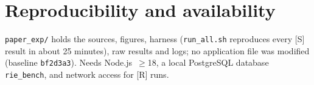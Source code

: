 \documentclass[conference]{IEEEtran}
\newcommand{\code}[1]{\texttt{\small #1}}
\begin{document}
\section*{Reproducibility and availability}
\code{paper\_exp/} holds the sources, figures, harness (\code{run\_all.sh} reproduces every [S] result in about 25 minutes), raw results and logs; no application file was modified (baseline \code{bf2d3a3}). Needs Node.js~$\ge$18, a local PostgreSQL database \code{rie\_bench}, and network access for [R] runs.

{\fontsize{7}{8.2}\selectfont


}
\end{document}
